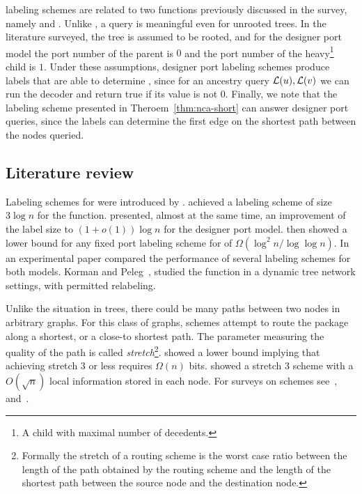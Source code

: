 \routing labeling schemes are related to two functions previously discussed in the survey, namely \ancestry and \NCA.
Unlike \ancestry, a \routing query is meaningful even for unrooted trees.
In the literature surveyed, the tree is assumed to be rooted, and for the designer port model the port number of the parent is $0$ and the port number of the heavy\footnote{A child with maximal number of  decedents.} child is $1$.
Under these assumptions, designer port \routing labeling schemes  produce labels that are able to determine \ancestry, since for an ancestry query $ \mathcal{L}(u), \mathcal{L}(v)$ we  can run the \routing decoder and return true if its value is not $0$. 
Finally, we note that the  \NCAl labeling scheme presented in Theroem~\ref{thm:nca-short}  can answer designer port \routing queries, since  the labels can determine the first edge on the shortest path between the nodes queried.
		
\subsection{Literature review}\label{routing:literature}
Labeling schemes for  \routing were introduced by .
    achieved a labeling scheme of size $3 \log n$ for the function.
  presented, almost at the same time, an improvement of the label size to $(1+o(1))\log n$ for the designer port model.
 then showed a lower bound  for any fixed port labeling scheme for \routing of $\Omega(\log^2 n / \log \log n )$. In an experimental paper  compared the performance of several labeling schemes for both models. Korman and Peleg~, studied the function in a  dynamic tree network settings, with permitted relabeling.

Unlike the situation in trees, there could be many paths between  two nodes in arbitrary graphs.
For this class of graphs, \routing schemes attempt to route the  package along a shortest, or a close-to shortest path.
The parameter measuring the quality of the path is called \textit{stretch}\footnote{Formally the stretch of a routing scheme is the worst case ratio between the length of the path obtained by the routing scheme and the length of the shortest path between the source node and the destination node.}.
 showed a lower bound implying that achieving stretch $3$ or less requires $\Omega(n)$ bits.  showed a stretch $3$  \routing scheme  with a $O(\sqrt n )$  local information stored in each node.
For surveys on \routing schemes see~\cite{gavoille2001routing}, and~\cite{Dom07}.

